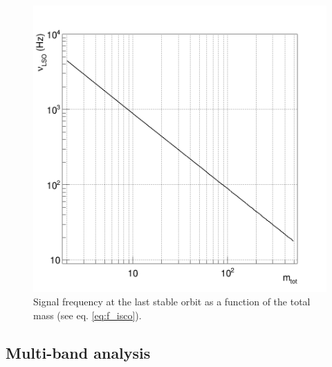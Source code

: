 
\begin{figure}
  \centering
  \includegraphics[width=0.5\linewidth]{sectionMBTA/cNuLSO.png}
  \caption{Signal frequency at the last stable orbit as a function of the total mass (see eq. \ref{eq:f_isco}).}
  \label{fig:nuLSO}
\end{figure}


\clearpage \newpage
\subsection{Multi-band analysis}
\label{sec:2bands}

